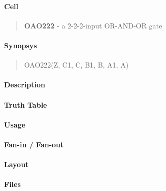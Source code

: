 \label{OAO222}
\paragraph{Cell}
\begin{quote}
    \textbf{OAO222} - a 2-2-2-input OR-AND-OR gate
\end{quote}

\paragraph{Synopsys}
\begin{quote}
    OAO222(Z, C1, C, B1, B, A1, A)
\end{quote}

\paragraph{Description}

%

\paragraph{Truth Table}
%

\paragraph{Usage}

\paragraph{Fan-in / Fan-out}

\paragraph{Layout}

\paragraph{Files}
